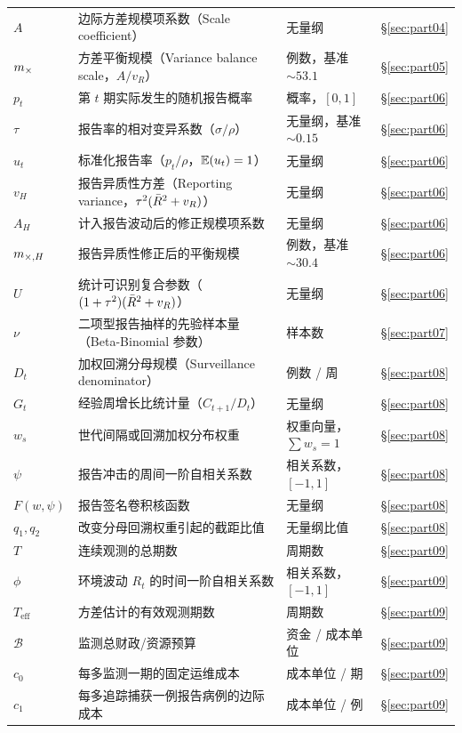 \begin{center}
\begin{longtable}{@{}llll@{}}
$A$ & 边际方差规模项系数（Scale coefficient） & 无量纲 & \S\ref{sec:part04} \\
$m_\times$ & 方差平衡规模（Variance balance scale，$A / v_R$） & 例数，基准 $\sim 53.1$ & \S\ref{sec:part05} \\
$p_t$ & 第 $t$ 期实际发生的随机报告概率 & 概率，$[0, 1]$ & \S\ref{sec:part06} \\
$\tau$ & 报告率的相对变异系数（$\sigma / \rho$） & 无量纲，基准 $\sim 0.15$ & \S\ref{sec:part06} \\
$u_t$ & 标准化报告率（$p_t / \rho$，$\mathbb{E}(u_t)=1$） & 无量纲 & \S\ref{sec:part06} \\
$v_H$ & 报告异质性方差（Reporting variance，$\tau^2(\bar{R}^2+v_R)$） & 无量纲 & \S\ref{sec:part06} \\
$A_H$ & 计入报告波动后的修正规模项系数 & 无量纲 & \S\ref{sec:part06} \\
$m_{\times,H}$ & 报告异质性修正后的平衡规模 & 例数，基准 $\sim 30.4$ & \S\ref{sec:part06} \\
$U$ & 统计可识别复合参数（$(1+\tau^2)(\bar{R}^2+v_R)$） & 无量纲 & \S\ref{sec:part06} \\
$\nu$ & 二项型报告抽样的先验样本量（Beta-Binomial 参数） & 样本数 & \S\ref{sec:part07} \\
$D_t$ & 加权回溯分母规模（Surveillance denominator） & 例数 / 周 & \S\ref{sec:part08} \\
$G_t$ & 经验周增长比统计量（$C_{t+1}/D_t$） & 无量纲 & \S\ref{sec:part08} \\
$w_s$ & 世代间隔或回溯加权分布权重 & 权重向量，$\sum w_s = 1$ & \S\ref{sec:part08} \\
$\psi$ & 报告冲击的周间一阶自相关系数 & 相关系数，$[-1, 1]$ & \S\ref{sec:part08} \\
$F(w, \psi)$ & 报告签名卷积核函数 & 无量纲 & \S\ref{sec:part08} \\
$q_1, q_2$ & 改变分母回溯权重引起的截距比值 & 无量纲比值 & \S\ref{sec:part08} \\
$T$ & 连续观测的总期数 & 周期数 & \S\ref{sec:part09} \\
$\phi$ & 环境波动 $R_t$ 的时间一阶自相关系数 & 相关系数，$[-1, 1]$ & \S\ref{sec:part09} \\
$T_{\mathrm{eff}}$ & 方差估计的有效观测期数 & 周期数 & \S\ref{sec:part09} \\
$\mathcal{B}$ & 监测总财政/资源预算 & 资金 / 成本单位 & \S\ref{sec:part09} \\
$c_0$ & 每多监测一期的固定运维成本 & 成本单位 / 期 & \S\ref{sec:part09} \\
$c_1$ & 每多追踪捕获一例报告病例的边际成本 & 成本单位 / 例 & \S\ref{sec:part09} \\

\end{longtable}
\end{center}
